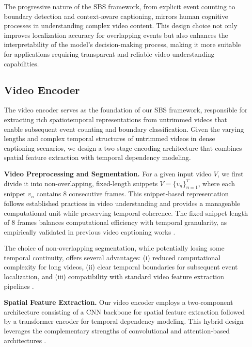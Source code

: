 The progressive nature of the SBS framework, from explicit event counting to boundary detection and context-aware captioning, mirrors human cognitive processes in understanding complex video content.
This design choice not only improves localization accuracy for overlapping events but also enhances the interpretability of the model's decision-making process, making it more suitable for applications requiring transparent and reliable video understanding capabilities.

\subsection{Video Encoder}
\label{subsec:method_video_encoder}

The video encoder serves as the foundation of our SBS framework, responsible for extracting rich spatiotemporal representations from untrimmed videos that enable subsequent event counting and boundary classification. Given the varying lengths and complex temporal structures of untrimmed videos in dense captioning scenarios, we design a two-stage encoding architecture that combines spatial feature extraction with temporal dependency modeling.

\textbf{Video Preprocessing and Segmentation.}
For a given input video $V$, we first divide it into non-overlapping, fixed-length snippets $V=\{v_n\}_{n=1}^{T}$, where each snippet $v_n$ contains 8 consecutive frames. This snippet-based representation follows established practices in video understanding \cite{Wang2019-xv,Feichtenhofer2019-mh} and provides a manageable computational unit while preserving temporal coherence. The fixed snippet length of 8 frames balances computational efficiency with temporal granularity, as empirically validated in previous video captioning works \cite{Krishna2017-pw,Zhou2018-zu}.

The choice of non-overlapping segmentation, while potentially losing some temporal continuity, offers several advantages: (i) reduced computational complexity for long videos, (ii) clear temporal boundaries for subsequent event localization, and (iii) compatibility with standard video feature extraction pipelines \cite{Carreira2017-fg,Tran2015-uq}.

\textbf{Spatial Feature Extraction.}
Our video encoder employs a two-component architecture consisting of a CNN backbone for spatial feature extraction followed by a transformer encoder for temporal dependency modeling. This hybrid design leverages the complementary strengths of convolutional and attention-based architectures \cite{Dosovitskiy2021-vn,Arnab2021-gv}.


